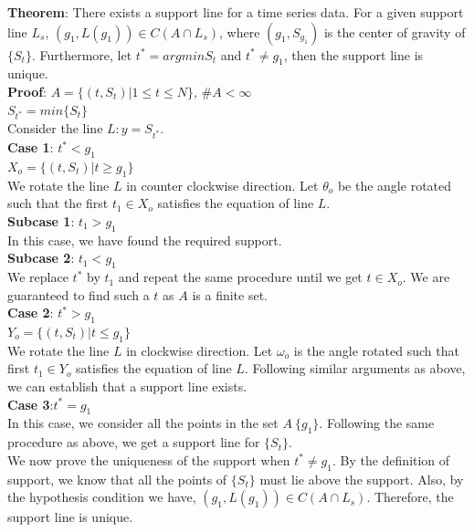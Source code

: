 \documentclass[letterpaper, 12pt] {article}
\begin{document}
	
	\noindent
	\textbf{Theorem}: There exists a support line for a time series data. For a given support line $L_s$, $(g_1,L(g_1))\in C(A \cap L_s)$, where $(g_1,S_{g_1})$ is the center of gravity of $\{ S_t\}$. Furthermore, let $t^*=argmin S_t$ and $t^*\ne g_1$, then the support line is unique.\\
	
	\noindent
	\textbf{Proof}: $A=\{(t,S_t)|1\leq t\leq N\}$, $\# A<\infty$\\
	$S_{t^*}=min\{ S_t\}$\\
	Consider the line $L:y=S_{t^*}$.\\
	
	\textbf{Case 1}: $t^*<g_1$\\
	$X_o=\{(t,S_t)|t\geq g_1\}$\\
	We rotate the line $L$ in counter clockwise direction.
	Let $\theta_o$ be the angle rotated such that the first $t_1\in X_o$ satisfies the equation of line $L$.\\
	\textbf{Subcase 1}: $t_1>g_1$\\
	In this case, we have found the required support.\\
	\textbf{Subcase 2}: $t_1<g_1$\\
	We replace $t^*$ by $t_1$ and repeat the same procedure until we get $t\in X_o$. We are guaranteed to find such a $t$ as $A$ is a finite set.\\
	
	\textbf{Case 2}: $t^*>g_1$\\
	$Y_o=\{(t,S_t)|t\leq g_1\}$\\
	We rotate the line $L$ in clockwise direction. Let $\omega_o$ is the angle rotated such that first $t_1\in Y_o$ satisfies the equation of line $L$. Following similar arguments as above, we can establish that a support line exists.\\
	
	\textbf{Case 3}:$t^*=g_1$\\
	In this case, we consider all the points in the set $A\ \{g_1\}$. Following the same procedure as above, we get a support line for $\{S_t\}$.\\
	
	\noindent
	We now prove the uniqueness of the support when $t^*\ne g_1$.
	By the definition of support, we know that all the points of $\{S_t\}$ must lie above the support. Also, by the hypothesis condition we have, $(g_1,L(g_1))\in C(A \cap L_s)$. Therefore, the support line is unique.
	
	
	
\end{document}
